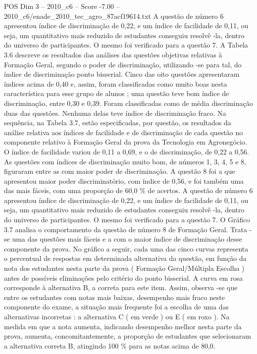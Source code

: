 \begin{textsample}{POS Dim 3 – 2010\_c6 – Score -7.00 – 2010\_c6/enade\_2010\_tec\_agro\_87acf19614.txt}
A questão de número 6 apresentou índice de discriminação de 0,22, e um índice de facilidade de 0,11, ou seja, um quantitativo mais reduzido de estudantes conseguiu resolvê -la, dentro do universo de participantes.
O mesmo foi verificado para a questão 7.
A Tabela 3.6 descreve os resultados das análises das questões objetivas relativas à Formação Geral, segundo o poder de discriminação, utilizando -se para tal, do índice de discriminação ponto bisserial.
Cinco das oito questões apresentaram índices acima de 0,40 e, assim, foram classificadas como muito boas nesta característica para esse grupo de alunos ; uma questão teve bom índice de discriminação, entre 0,30 e 0,39.
Foram classificadas como de média discriminação duas das questões.
Nenhuma delas teve índice de discriminação fraco.
Na sequência, na Tabela 3.7, estão especificadas, por questão, os resultados da análise relativa aos índices de facilidade e de discriminação de cada questão no componente relativo à Formação Geral da prova da Tecnologia em Agronegócio.
O índice de facilidade variou de 0,11 a 0,69, e o de discriminação, de 0,22 a 0,56.
As questões com índices de discriminação muito bom, de números 1, 3, 4, 5 e 8, figuraram entre as com maior poder de discriminação.
A questão 8 foi a que apresentou maior poder discriminatório, com índice de 0,56, e foi também uma das mais fáceis, com uma proporção de 60,0 \% de acertos.
A questão de número 6 apresentou índice de discriminação de 0,22, e um índice de facilidade de 0,11, ou seja, um quantitativo mais reduzido de estudantes conseguiu resolvê -la, dentro do universo de participantes.
O mesmo foi verificado para a questão 7.
O Gráfico 3.7 analisa o comportamento da questão de número 8 de Formação Geral.
Trata -se uma das questões mais fáceis e a com o maior índice de discriminação desse componente da prova.
No gráfico a seguir, cada uma das cinco curvas representa o percentual de respostas em determinada alternativa da questão, em função da nota dos estudantes nesta parte da prova ( Formação Geral/Múltipla Escolha ) antes de possíveis eliminações pelo critério do ponto bisserial.
A curva em rosa corresponde à alternativa B, a correta para este item.
Assim, observa -se que entre os estudantes com notas mais baixas, desempenho mais fraco neste componente do exame, a situação mais frequente foi a escolha de uma das alternativas incorretas : a alternativa C ( em verde ) ou E ( em roxo ).
Na medida em que a nota aumenta, indicando desempenho melhor nesta parte da prova, aumenta, concomitantemente, a proporção de estudantes que selecionaram a alternativa correta B, atingindo 100 \% para as notas acima de 80,0.

\end{textsample}
